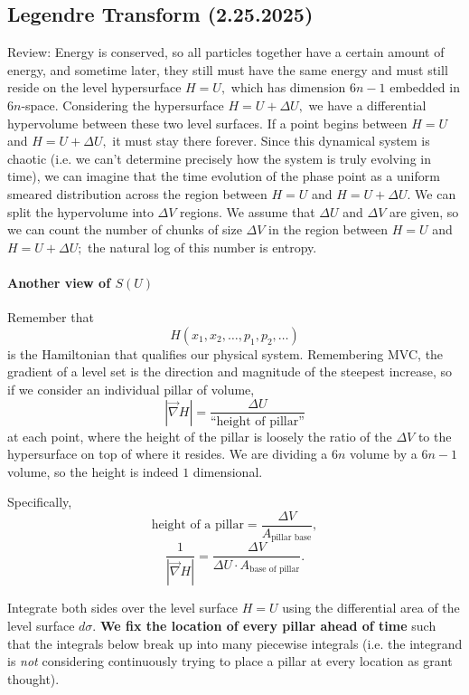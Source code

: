 \documentclass[12pt]{article}
\theoremstyle{remark}
\begin{document}
\subsection{Legendre Transform (2.25.2025)}
Review: Energy is conserved, so all particles together have a certain amount of energy, and sometime later, they still must have the same energy and must still reside on the level hypersurface $H=U,$ which has dimension $6n-1$ embedded in $6n$-space. Considering the hypersurface $H=U+\Delta U,$ we have a differential hypervolume between these two level surfaces. If a point begins between $H=U$ and $H=U+\Delta U,$ it must stay there forever. Since this dynamical system is chaotic (i.e. we can't determine precisely how the system is truly evolving in time), we can imagine that the time evolution of the phase point as a uniform smeared distribution across the region between $H=U$ and $H=U+\Delta U.$ We can split the hypervolume into $\Delta V$ regions. We assume that $\Delta U$ and $\Delta V$ are given, so we can count the number of chunks of size $\Delta V$ in the region between $H=U$ and $H=U+\Delta U;$ the natural log of this number is entropy.


\paragraph{Another view of $S(U)$}
Remember that
\[H(x_1,x_2,\dots,p_1,p_2,\dots)\] is the Hamiltonian that qualifies our physical system. Remembering MVC, the gradient of a level set is the direction and magnitude of the steepest increase, so if we consider an individual pillar of volume,
\[|\vec\nabla H|=\frac{\Delta U}{\text{``height of pillar''}}\] at each point,
where the height of the pillar is loosely the ratio of the $\Delta V$ to the hypersurface on top of where it resides. We are dividing a $6n$ volume by a $6n-1$ volume, so the height is indeed $1$ dimensional.

Specifically,
\[\text{height of a pillar} = \frac{\Delta V}{A_{\text{pillar base}}},\]
\[\frac{1}{|\vec\nabla H|}=\frac{\Delta V}{\Delta U\cdot A_{\text{base of pillar}}}.\]

Integrate both sides over the level surface $H=U$ using the differential area of the level surface $d\sigma$. \textbf{We fix the location of every pillar ahead of time} such that the integrals below break up into many piecewise integrals (i.e. the integrand is \emph{not} considering continuously trying to place a pillar at every location as grant thought).
\end{document}
